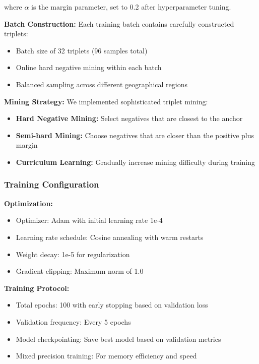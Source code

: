 where $\alpha$ is the margin parameter, set to 0.2 after hyperparameter tuning.

\textbf{Batch Construction:} Each training batch contains carefully constructed triplets:
\begin{itemize}
    \item Batch size of 32 triplets (96 samples total)
    \item Online hard negative mining within each batch
    \item Balanced sampling across different geographical regions
\end{itemize}

\textbf{Mining Strategy:} We implemented sophisticated triplet mining:
\begin{itemize}
    \item \textbf{Hard Negative Mining:} Select negatives that are closest to the anchor
    \item \textbf{Semi-hard Mining:} Choose negatives that are closer than the positive plus margin
    \item \textbf{Curriculum Learning:} Gradually increase mining difficulty during training
\end{itemize}

\subsubsection{Training Configuration}

\textbf{Optimization:}
\begin{itemize}
    \item Optimizer: Adam with initial learning rate 1e-4
    \item Learning rate schedule: Cosine annealing with warm restarts
    \item Weight decay: 1e-5 for regularization
    \item Gradient clipping: Maximum norm of 1.0
\end{itemize}

\textbf{Training Protocol:}
\begin{itemize}
    \item Total epochs: 100 with early stopping based on validation loss
    \item Validation frequency: Every 5 epochs
    \item Model checkpointing: Save best model based on validation metrics
    \item Mixed precision training: For memory efficiency and speed
\end{itemize}

